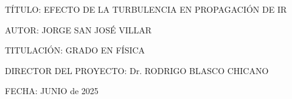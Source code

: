 

\setlength{\headheight}{30.14165pt} %

\pagestyle{fancy} %
\fancyhf{} %



\fancyfoot[C]{\thepage}

\makeatletter
\renewcommand{\cleardoublepage}{\clearpage\thispagestyle{plain}}
\makeatother

\setlength{\columnsep}{1cm} %
\setlength{\columnseprule}{0pt} %

\raggedcolumns


TÍTULO: EFECTO DE LA TURBULENCIA EN PROPAGACIÓN DE IR 

\vspace*{1cm}
AUTOR: JORGE SAN JOSÉ VILLAR

\vspace*{1cm}
TITULACIÓN: GRADO EN FÍSICA 

\vspace*{1cm}
DIRECTOR DEL PROYECTO: Dr. RODRIGO BLASCO CHICANO

\vspace*{1cm}
FECHA: JUNIO de 2025

\newpage


